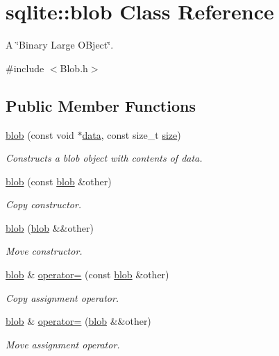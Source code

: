 \hypertarget{a00002}{\section{sqlite\-:\-:blob Class Reference}
\label{a00002}
}


A \char`\"{}\-Binary Large O\-Bject\char`\"{}.  




{\ttfamily \#include $<$Blob.\-h$>$}

\subsection*{Public Member Functions}
\begin{DoxyCompactItemize}
\item 
\hyperlink{a00002_ad3d7146a3081de7c96a37b9641f83dd6}{blob} (const void $\ast$\hyperlink{a00002_ad9fc3eb820ef6fa64a4a03224b9dc3de}{data}, const size\-\_\-t \hyperlink{a00002_a28b69b40596ded278607604396b86c97}{size})
\begin{DoxyCompactList}\small\item\em Constructs a blob object with contents of data. \end{DoxyCompactList}\item 
\hyperlink{a00002_a1f1bca1ecf4615c4948f3af74814abde}{blob} (const \hyperlink{a00002}{blob} \&other)
\begin{DoxyCompactList}\small\item\em Copy constructor. \end{DoxyCompactList}\item 
\hyperlink{a00002_a78501ec4704d95d590457eacc63f39b6}{blob} (\hyperlink{a00002}{blob} \&\&other)
\begin{DoxyCompactList}\small\item\em Move constructor. \end{DoxyCompactList}\item 
\hyperlink{a00002}{blob} \& \hyperlink{a00002_a1962255cded865181174a67351d58fb8}{operator=} (const \hyperlink{a00002}{blob} \&other)
\begin{DoxyCompactList}\small\item\em Copy assignment operator. \end{DoxyCompactList}\item 
\hyperlink{a00002}{blob} \& \hyperlink{a00002_a93a890b30c970d76fc51ad7ed4bb36c1}{operator=} (\hyperlink{a00002}{blob} \&\&other)
\begin{DoxyCompactList}\small\item\em Move assignment operator. \end{DoxyCompactList}\item 

\end{DoxyCompactItemize}
